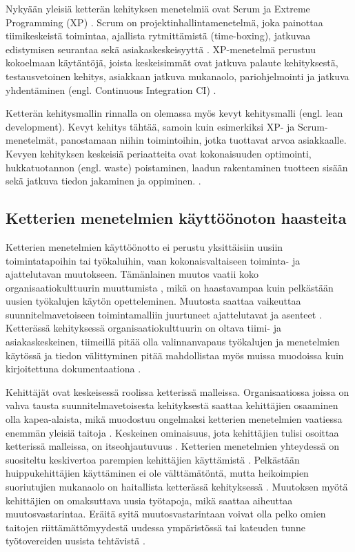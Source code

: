 Nykyään yleisiä ketterän kehityksen menetelmiä ovat Scrum ja Extreme Programming
(XP) . Scrum on projektinhallintamenetelmä, joka painottaa
tiimikeskeistä toimintaa, ajallista rytmittämistä (time-boxing), jatkuvaa
edistymisen seurantaa sekä asiakaskeskeisyyttä .
XP-menetelmä perustuu kokoelmaan käytäntöjä, joista keskeisimmät ovat jatkuva
palaute kehityksestä, testausvetoinen kehitys, asiakkaan jatkuva mukanaolo,
pariohjelmointi ja jatkuva yhdentäminen (engl. Continuous Integration
CI) .

Ketterän kehitysmallin rinnalla on olemassa myös kevyt kehitysmalli (engl. lean
development). Kevyt kehitys tähtää, samoin kuin esimerkiksi XP- ja
Scrum-menetelmät, panostamaan niihin toimintoihin, jotka tuottavat arvoa
asiakkaalle. Kevyen kehityksen keskeisiä periaatteita ovat kokonaisuuden
optimointi, hukkatuotannon (engl. waste) poistaminen, laadun rakentaminen
tuotteen sisään sekä jatkuva tiedon jakaminen ja oppiminen.
.

\subsection{Ketterien menetelmien käyttöönoton haasteita}

Ketterien menetelmien käyttöönotto ei perustu yksittäisiin uusiin
toimintatapoihin tai työkaluihin, vaan kokonaisvaltaiseen toiminta- ja
ajattelutavan muutokseen. Tämänlainen muutos vaatii koko organisaatiokulttuurin
muuttumista , mikä on haastavampaa kuin pelkästään uusien
työkalujen käytön opetteleminen. Muutosta saattaa vaikeuttaa
suunnitelmavetoiseen toimintamalliin juurtuneet ajattelutavat ja asenteet
. Ketterässä kehityksessä organisaatiokulttuurin
on oltava tiimi- ja asiakaskeskeinen, tiimeillä pitää olla valinnanvapaus
työkalujen ja menetelmien käytössä ja tiedon välittyminen pitää mahdollistaa
myös muissa muodoissa kuin kirjoitettuna dokumentaationa .

Kehittäjät ovat keskeisessä roolissa ketterissä malleissa. Organisaatiossa
joissa on vahva tausta suunnitelmavetoisesta kehityksestä saattaa kehittäjien
osaaminen olla kapea-alaista, mikä muodostuu ongelmaksi ketterien menetelmien
vaatiessa enemmän yleisiä taitoja . Keskeinen ominaisuus,
jota kehittäjien tulisi osoittaa ketterissä malleissa, on itseohjautuvuus
. Ketterien menetelmien yhteydessä on suositeltu keskivertoa
parempien kehittäjien käyttämistä . Pelkästään
huippukehittäjien käyttäminen ei ole välttämätöntä, mutta heikoimpien
suoriutujien mukanaolo on haitallista ketterässä kehityksessä
. Muutoksen myötä kehittäjien on omaksuttava uusia
työtapoja, mikä saattaa aiheuttaa muutosvastarintaa. Eräitä syitä
muutosvastarintaan voivat olla pelko omien taitojen riittämättömyydestä uudessa
ympäristössä tai kateuden tunne työtovereiden uusista tehtävistä
.

